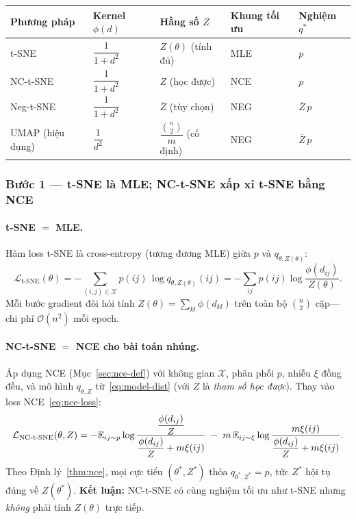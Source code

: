 \begin{center}
\renewcommand{\arraystretch}{1.3}
\begin{tabular}{@{}lllll@{}}
\toprule
\textbf{Phương pháp} & \textbf{Kernel $\phi(d)$} & \textbf{Hằng số $Z$} & \textbf{Khung tối ưu} & \textbf{Nghiệm $q^*$} \\
\midrule
t-SNE        & $\dfrac{1}{1+d^2}$ & $Z(\theta)$ (tính đủ)  & MLE & $p$ \\[4pt]
NC-t-SNE     & $\dfrac{1}{1+d^2}$ & $Z$ (học được)         & NCE & $p$ \\[4pt]
Neg-t-SNE    & $\dfrac{1}{1+d^2}$ & $\overline{Z}$ (tùy chọn) & NEG & $\overline{Z}\,p$ \\[4pt]
UMAP (hiệu dụng) & $\dfrac{1}{d^2}$ & $\dfrac{\binom{n}{2}}{m}$ (cố định) & NEG & $\overline{Z}\,p$ \\
\bottomrule
\end{tabular}
\end{center}

\subsubsection{Bước 1 --- t-SNE là MLE; NC-t-SNE xấp xỉ t-SNE bằng NCE}
\label{sec:mle-to-nce}

\paragraph{t-SNE $=$ MLE.}
Hàm loss t-SNE là cross-entropy (tương đương MLE) giữa $p$ và $q_{\theta,Z(\theta)}$:
\begin{equation}
  \mathcal{L}_{\text{t-SNE}}(\theta)
  = -\sum_{(i,j)\in\mathcal{X}} p(ij)\,\log q_{\theta,Z(\theta)}(ij)
  = -\sum_{ij} p(ij)\log\frac{\phi(d_{ij})}{Z(\theta)}.
  \label{eq:tsne-loss-ch4}
\end{equation}
Mỗi bước gradient đòi hỏi tính $Z(\theta) = \sum_{kl}\phi(d_{kl})$ trên toàn bộ $\binom{n}{2}$ cặp---chi phí $\mathcal{O}(n^2)$ mỗi epoch.

\paragraph{NC-t-SNE $=$ NCE cho bài toán nhúng.}
Áp dụng NCE (Mục~\ref{sec:nce-def}) với không gian $\mathcal{X}$, phân phối $p$, nhiễu $\xi$ đồng đều, và mô hình $q_{\theta,Z}$ từ~\eqref{eq:model-dist} (với $Z$ là \emph{tham số học được}). Thay vào loss NCE~\eqref{eq:nce-loss}:
\begin{equation}
  \mathcal{L}_{\text{NC-t-SNE}}(\theta, Z)
  = -\mathbb{E}_{ij \sim p}\log\dfrac{\dfrac{\phi(d_{ij})}{Z}}{\dfrac{\phi(d_{ij})}{Z} + m\xi(ij)}
  \;-\; m\,\mathbb{E}_{ij \sim \xi}\log\dfrac{m\xi(ij)}{\dfrac{\phi(d_{ij})}{Z} + m\xi(ij)}.
  \label{eq:nc-tsne-loss}
\end{equation}
Theo Định lý~\ref{thm:nce}, mọi cực tiểu $(\theta^*, Z^*)$ thỏa $q_{\theta^*,Z^*} = p$, tức $Z^*$ hội tụ đúng về $Z(\theta^*)$. \textbf{Kết luận:} NC-t-SNE có cùng nghiệm tối ưu như t-SNE nhưng \emph{không} phải tính $Z(\theta)$ trực tiếp.

